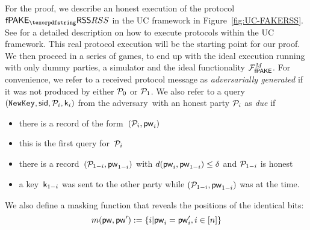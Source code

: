 
For the proof, we describe an honest execution of the protocol $\PfakeRSS$ in the UC framework in Figure~\ref{fig:UC-FAKERSS}. See \cite{SCN:FreHesHof14} for a detailed description on how to execute protocols within the UC framework. This real protocol execution will be the starting point for our proof. We then proceed in a series of games, to end up with the ideal execution running with only dummy parties, a simulator and the ideal functionality $\mathcal{F}_\textsf{fPAKE}^M$. For convenience, we refer to a received protocol message as \emph{adversarially generated} if it was not produced by either $\mathcal{P}_{0}$ or $\mathcal{P}_{1}$.
	We also refer to a query 
	$(\texttt{NewKey},\mathsf{sid},\mathcal{P}_{i},\mathsf{k}_{i})$ from the adversary~\Sim with an honest party $\mathcal{P}_{i}$ as \emph{due} if
	\begin{itemize}
		\item there is a  record of the form~$(\mathcal{P}_{i},\mathsf{pw}_{i})$
		\item this is the first \NewKey query for~$\mathcal{P}_{i}$
		\item there is a record~$(\mathcal{P}_{1-i},\mathsf{pw}_{1-i})$ with $d(\mathsf{pw}_{i},\mathsf{pw}_{1-i}) \leq \delta$ and $\mathcal{P}_{1-i}$ is honest
		\item a key~$\mathsf{k}_{1-i}$ was sent to the other party while $(\mathcal{P}_{1-i},\mathsf{pw}_{1-i})$ was  at the time.
	\end{itemize}
We also define a masking function that reveals the positions of the identical bits:
$$m(\mathsf{pw}, \mathsf{pw}'):=\left\{i | \mathsf{pw}_i = \mathsf{pw}'_i , i \in [n]\right\}$$


